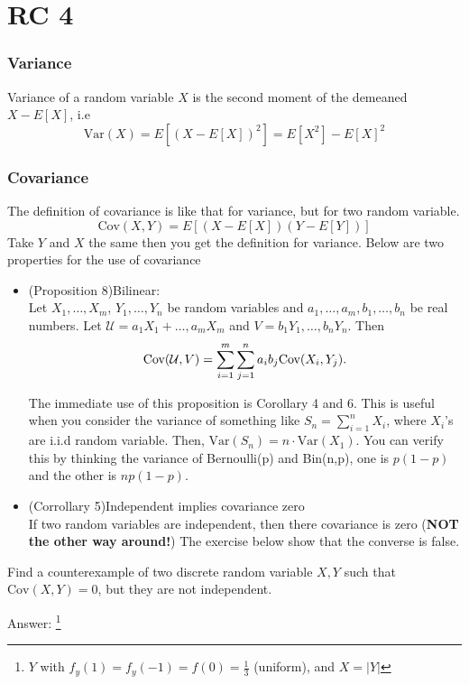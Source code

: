 \chapter{RC 4}


\subsection{Variance}
Variance of a random variable \(X\) is the second moment of the demeaned \(X-E[X]\), i.e
\[
    \text{Var} (X) = E[(X-E[X])^2] = E[X^2] - E[X]^2
\]
\subsection{Covariance}
The definition of covariance is like that for variance, but for two random variable. 
\[
    \text{Cov} (X,Y) = E[(X-E[X])(Y-E[Y])]
\]
Take \(Y\) and \(X\) the same then you get the definition for variance. 
Below are two properties for the use of covariance
\begin{itemize}
    \item (Proposition 8)Bilinear:\\
    Let \(X_1,\dots, X_m\), \(Y_1, \dots, Y_n\) be random variables and \(a_1,\dots,a_m,  b_1,\dots,b_n\) be real numbers. Let \(\mathcal{U} = a_1 X_1 + \dots, a_m X_m \) and \(V = b_1 Y_1, \dots, b_n Y_n\). Then
    \[
        \text{Cov} (\mathcal{\MakeUppercase{U}} ,V) = \sum_{i=1}^{m} \sum_{j=1}^{n} a_i b_j \text{Cov}(X_{i}, Y_{j}). 
    \]    
    
    The immediate use of this proposition is Corollary 4 and 6. This is useful when you consider the variance of something like \(S_n = \sum_{i=1}^{n} X_i\), where \(X_i\)'s are i.i.d random variable. Then, \(\text{Var} (S_n) = n \cdot \text{Var}(X_1) \). You can verify this by thinking the variance of Bernoulli(p) and Bin(n,p), one is \(p(1-p)\) and the other is \(np(1-p)\).     
   
        
    \item (Corrollary 5)Independent implies covariance zero\\
    If two random variables are independent, then there covariance is zero (\textbf{NOT the other way around!})
    The exercise below show that the converse is false.  
\end{itemize}
\begin{exercise}
    Find a counterexample of two discrete random variable \(X,Y\) such that \(\text{Cov}(X,Y) = 0  \), but they are not independent. 
\end{exercise}
Answer: \footnote[1]{\(Y\) with \(f_y(1) = f_y(-1) = f(0) = \frac{1}{3}\) (uniform), and \(X = |Y|\) } 
